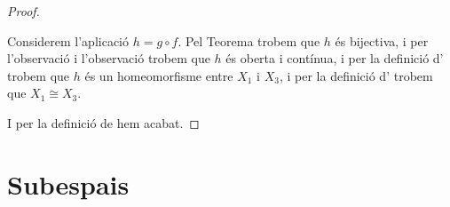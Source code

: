 \documentclass[../Apunts.tex]{subfiles}
\begin{document}
\begin{proposition}
\begin{proof}
\begin{enumerate}
					Considerem l'aplicació \(h=g\circ f\). Pel Teorema  trobem que \(h\) és bijectiva, i per l'observació  i l'observació  trobem que \(h\) és oberta i contínua, i per la definició d' trobem que \(h\) és un homeomorfisme entre \(X_{1}\) i \(X_{3}\), i per la definició d' trobem que \(X_{1}\cong X_{3}\).
				\end{enumerate}
				I per la definició de  hem acabat.
			\end{proof}
	\end{proposition}
	\section{Subespais}
\end{document}
